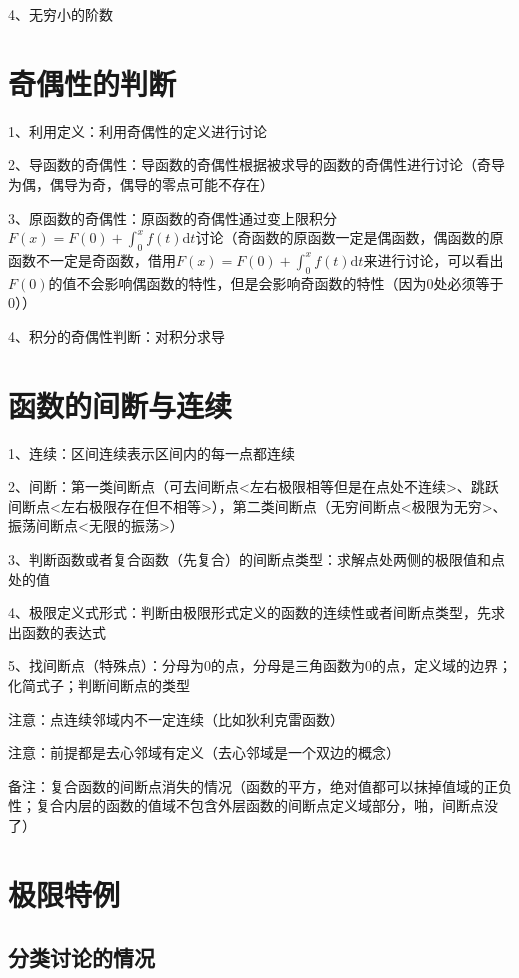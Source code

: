 4、无穷小的阶数

\section{奇偶性的判断}

1、利用定义：利用奇偶性的定义进行讨论

2、导函数的奇偶性：导函数的奇偶性根据被求导的函数的奇偶性进行讨论（奇导为偶，偶导为奇，偶导的零点可能不存在）

3、原函数的奇偶性：原函数的奇偶性通过变上限积分$F(x)=F(0)+\int_{0}^{x} f(t) \mathrm{d} t$讨论（奇函数的原函数一定是偶函数，偶函数的原函数不一定是奇函数，借用$F(x)=F(0)+\int_{0}^{x} f(t) \mathrm{d} t$来进行讨论，可以看出$F(0)$的值不会影响偶函数的特性，但是会影响奇函数的特性（因为0处必须等于0））

4、积分的奇偶性判断：对积分求导

\section{函数的间断与连续}

1、连续：区间连续表示区间内的每一点都连续

2、间断：第一类间断点（可去间断点<左右极限相等但是在点处不连续>、跳跃间断点<左右极限存在但不相等>），第二类间断点（无穷间断点<极限为无穷>、振荡间断点<无限的振荡>）

3、判断函数或者复合函数（先复合）的间断点类型：求解点处两侧的极限值和点处的值

4、极限定义式形式：判断由极限形式定义的函数的连续性或者间断点类型，先求出函数的表达式

5、找间断点（特殊点）：分母为0的点，分母是三角函数为0的点，定义域的边界；化简式子；判断间断点的类型

注意：点连续邻域内不一定连续（比如狄利克雷函数）

注意：前提都是去心邻域有定义（去心邻域是一个双边的概念）

备注：复合函数的间断点消失的情况（函数的平方，绝对值都可以抹掉值域的正负性；复合内层的函数的值域不包含外层函数的间断点定义域部分，啪，间断点没了）

\section{极限特例}



\subsection{分类讨论的情况}

